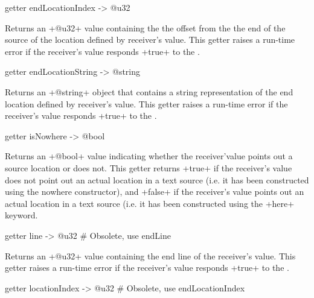 
\begin{galgas4}
getter endLocationIndex -> @u32
\end{galgas4}

Returns an \ggsq+@u32+ value containing the the offset from the the end of the source of the location defined by receiver's value. This getter raises a run-time error if the receiver's value responds \ggsq+true+ to the .




\begin{galgas4}
getter endLocationString -> @string
\end{galgas4}

Returns an \ggsq+@string+ object that contains a string representation of the end location defined by receiver's value. This getter raises a run-time error if the receiver's value responds \ggsq+true+ to the .



\begin{galgas4}
getter isNowhere -> @bool
\end{galgas4}

Returns an \ggsq+@bool+ value indicating whether the receiver'value points out a source location or does not. This getter returns \ggsq+true+ if the receiver's value does not point out an actual location in a text source (i.e. it has been constructed using the nowhere constructor), and \ggsq+false+ if the receiver's value points out an actual location in a text source (i.e. it has been constructed using the \ggsq+here+ keyword.



\begin{galgas4}
getter line -> @u32  # Obsolete, use endLine
\end{galgas4}

Returns an \ggsq+@u32+ value containing the end line of the receiver's value. This getter raises a run-time error if the receiver's value responds \ggsq+true+ to the .




\begin{galgas4}
getter locationIndex -> @u32 # Obsolete, use endLocationIndex
\end{galgas4}

